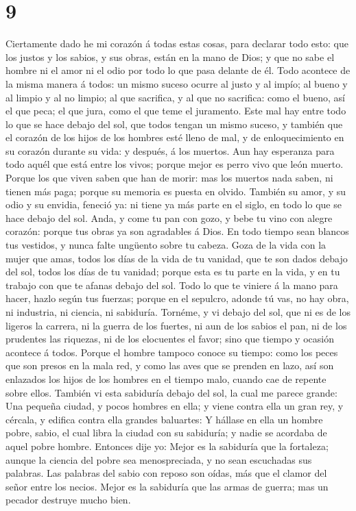 \hypertarget{section-8}{%
\section{9}\label{section-8}}

 Ciertamente dado he mi corazón á todas estas cosas, para
declarar todo esto: que los justos y los sabios, y sus obras, están en
la mano de Dios; y que no sabe el hombre ni el amor ni el odio por todo
lo que pasa delante de él.  Todo acontece de la misma
manera á todos: un mismo suceso ocurre al justo y al impío; al bueno y
al limpio y al no limpio; al que sacrifica, y al que no sacrifica: como
el bueno, así el que peca; el que jura, como el que teme el juramento.
 Este mal hay entre todo lo que se hace debajo del sol,
que todos tengan un mismo suceso, y también que el corazón de los hijos
de los hombres esté lleno de mal, y de enloquecimiento en su corazón
durante su vida: y después, á los muertos.  Aun hay
esperanza para todo aquél que está entre los vivos; porque mejor es
perro vivo que león muerto.  Porque los que viven saben
que han de morir: mas los muertos nada saben, ni tienen más paga; porque
su memoria es puesta en olvido.  También su amor, y su
odio y su envidia, feneció ya: ni tiene ya más parte en el siglo, en
todo lo que se hace debajo del sol.  Anda, y come tu pan
con gozo, y bebe tu vino con alegre corazón: porque tus obras ya son
agradables á Dios.  En todo tiempo sean blancos tus
vestidos, y nunca falte ungüento sobre tu cabeza.  Goza de
la vida con la mujer que amas, todos los días de la vida de tu vanidad,
que te son dados debajo del sol, todos los días de tu vanidad; porque
esta es tu parte en la vida, y en tu trabajo con que te afanas debajo
del sol.  Todo lo que te viniere á la mano para hacer,
hazlo según tus fuerzas; porque en el sepulcro, adonde tú vas, no hay
obra, ni industria, ni ciencia, ni sabiduría.  Tornéme, y
vi debajo del sol, que ni es de los ligeros la carrera, ni la guerra de
los fuertes, ni aun de los sabios el pan, ni de los prudentes las
riquezas, ni de los elocuentes el favor; sino que tiempo y ocasión
acontece á todos.  Porque el hombre tampoco conoce su
tiempo: como los peces que son presos en la mala red, y como las aves
que se prenden en lazo, así son enlazados los hijos de los hombres en el
tiempo malo, cuando cae de repente sobre ellos.  También
vi esta sabiduría debajo del sol, la cual me parece grande:
 Una pequeña ciudad, y pocos hombres en ella; y viene
contra ella un gran rey, y cércala, y edifica contra ella grandes
baluartes:  Y hállase en ella un hombre pobre, sabio, el
cual libra la ciudad con su sabiduría; y nadie se acordaba de aquel
pobre hombre.  Entonces dije yo: Mejor es la sabiduría
que la fortaleza; aunque la ciencia del pobre sea menospreciada, y no
sean escuchadas sus palabras.  Las palabras del sabio con
reposo son oídas, más que el clamor del señor entre los necios.
 Mejor es la sabiduría que las armas de guerra; mas un
pecador destruye mucho bien.

